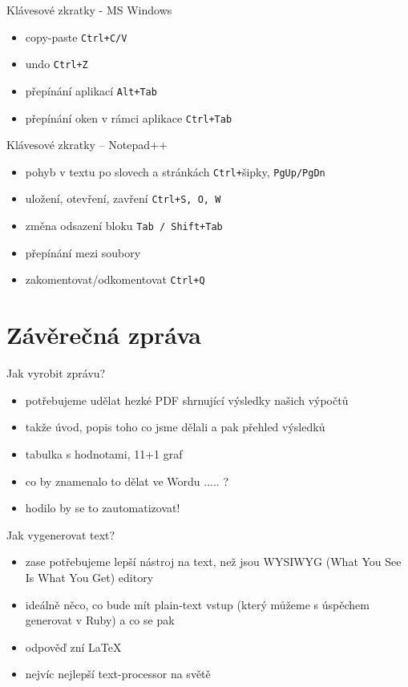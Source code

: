 \documentclass{beamer}
\begin{document}
\begin{frame}{Klávesové zkratky - MS Windows}
  \begin{itemize}
    \item copy-paste \texttt{Ctrl+C/V}
    \item undo \texttt{Ctrl+Z}
    \item přepínání aplikací \texttt{Alt+Tab}
    \item přepínání oken v rámci aplikace \texttt{Ctrl+Tab}
  \end{itemize}
\end{frame}

\begin{frame}{Klávesové zkratky -- Notepad++}
  \begin{itemize}
    \item pohyb v textu po slovech a stránkách  \texttt{Ctrl+}šipky, \texttt{PgUp/PgDn}
    \item uložení, otevření, zavření  \texttt{Ctrl+S, O, W}
    \item změna odsazení bloku \texttt{Tab / Shift+Tab}
    \item přepínání mezi soubory
    \item zakomentovat/odkomentovat \texttt{Ctrl+Q}
  \end{itemize}
\end{frame}

\section{Závěrečná zpráva}

\begin{frame}{Jak vyrobit zprávu?}
  \begin{itemize}
    \item potřebujeme udělat hezké PDF shrnující výsledky našich výpočtů
    \item takže úvod, popis toho co jsme dělali a pak přehled výsledků
    \item tabulka s hodnotami, 11+1 graf
    \item co by znamenalo to dělat ve Wordu ..... ?
    \item hodilo by se to zautomatizovat!
  \end{itemize}
\end{frame}

\begin{frame}{Jak vygenerovat text?}
  \begin{itemize}
    \item zase potřebujeme lepší nástroj na text, než jsou WYSIWYG (What You See Is What You Get) editory
    \item ideálně něco, co bude mít plain-text vstup (který můžeme s úspěchem generovat v Ruby) a co se pak
    \item odpověď zní \LaTeX
    \item nejvíc nejlepší text-processor na světě
  \end{itemize}
\end{frame}
\end{document}
